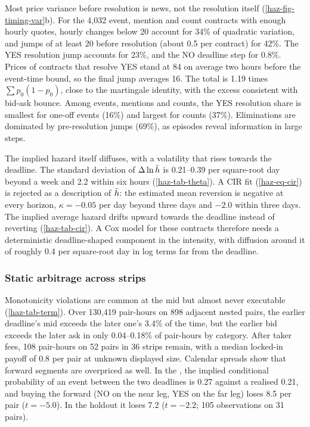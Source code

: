 Most price variance before resolution is news, not the resolution itself
(\cref{haz-fig-timing-var}b). For the 4{,}032 event, mention and count contracts with enough hourly
quotes, hourly changes below 20\cents{} account for 34\% of quadratic variation, and jumps of at
least 20\cents{} before resolution (about 0.5 per contract) for 42\%. The YES resolution jump accounts
for 23\%, and the NO deadline step for 0.8\%. Prices of contracts that resolve YES stand at 84\cents{}
on average two hours before the event-time bound, so the final jump averages 16\cents. The total is
1.19 times $\sum p_0(1-p_0)$, close to the martingale identity, with the excess consistent with
bid-ask bounce. Among events, mentions and counts, the YES resolution share is smallest for one-off events (16\%)
and largest for counts (37\%).
Eliminations are dominated by pre-resolution jumps (69\%), as episodes reveal information in large
steps.

The implied hazard itself diffuses, with a volatility that rises towards the deadline. The standard
deviation of $\Delta\ln\bar h$ is 0.21--0.39 per square-root day beyond a week and 2.2 within six
hours (\cref{haz-tab-theta}). A CIR fit (\cref{haz-eq-cir}) is rejected as a description of
$\bar h$: the estimated mean reversion is negative at every horizon, $\kappa=-0.05$ per day beyond
three days and $-2.0$ within three days. The implied average hazard drifts upward towards the
deadline instead of reverting (\cref{haz-tab-cir}). A Cox model for these contracts therefore needs a
deterministic deadline-shaped component in the intensity, with diffusion around it of roughly 0.4 per
square-root day in log terms far from the deadline.

\subsubsection{Static arbitrage across strips}\label{haz-res-arb}

Monotonicity violations are common at the mid but almost never executable (\cref{haz-tab-term}). Over
130{,}419 pair-hours on 898 adjacent nested pairs, the earlier deadline's mid exceeds the later one's
3.4\% of the time, but the earlier bid exceeds the later ask in only 0.04--0.18\% of pair-hours by
category. After taker fees, 108 pair-hours on 52 pairs in 36 strips remain, with a median locked-in
payoff of 0.8\cents{} per pair at unknown displayed size.
Calendar spreads show that forward segments are overpriced as well. In the \estim, the implied
conditional probability of an event between the two deadlines is 0.27 against a realised 0.21, and
buying the forward (NO on the near leg, YES on the far leg) loses 8.5\cents{} per pair ($t=-5.0$).
In the holdout it loses 7.2\cents{} ($t=-2.2$; 105 observations on 31 pairs).

